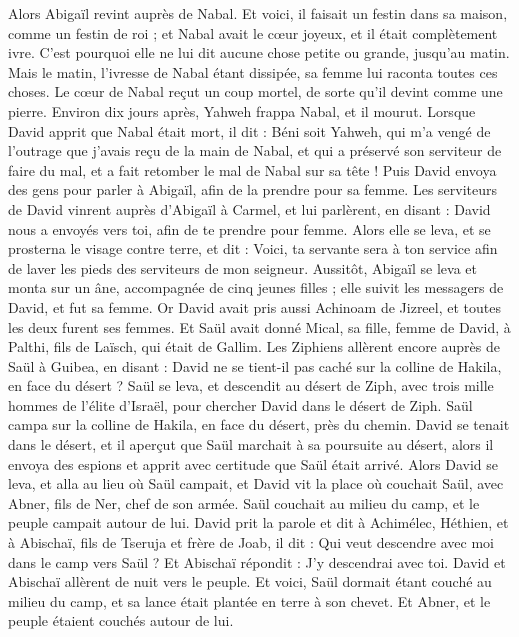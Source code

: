 \begin{multicols}{2}
Alors Abigaïl revint auprès de Nabal. Et voici, il faisait un festin dans sa maison, comme un festin de roi ; et Nabal avait le cœur joyeux, et il était complètement ivre. C'est pourquoi elle ne lui dit aucune chose petite ou grande, jusqu'au matin.
Mais le matin, l’ivresse de Nabal étant dissipée, sa femme lui raconta toutes ces choses. Le cœur de Nabal reçut un coup mortel, de sorte qu'il devint comme une pierre.
Environ dix jours après, Yahweh frappa Nabal, et il mourut.
Lorsque David apprit que Nabal était mort, il dit : Béni soit Yahweh, qui m'a vengé de l'outrage que j'avais reçu de la main de Nabal, et qui a préservé son serviteur de faire du mal, et a fait retomber le mal de Nabal sur sa tête ! Puis David envoya des gens pour parler à Abigaïl, afin de la prendre pour sa femme.
Les serviteurs de David vinrent auprès d'Abigaïl à Carmel, et lui parlèrent, en disant : David nous a envoyés vers toi, afin de te prendre pour femme.
Alors elle se leva, et se prosterna le visage contre terre, et dit : Voici, ta servante sera à ton service afin de laver les pieds des serviteurs de mon seigneur.
Aussitôt, Abigaïl se leva et monta sur un âne, accompagnée de cinq jeunes filles ; elle suivit les messagers de David, et fut sa femme.
Or David avait pris aussi Achinoam de Jizreel, et toutes les deux furent ses femmes.
Et Saül avait donné Mical, sa fille, femme de David, à Palthi, fils de Laïsch, qui était de Gallim.
\VerseOne{}Les Ziphiens allèrent encore auprès de Saül à Guibea, en disant : David ne se tient-il pas caché sur la colline de Hakila, en face du désert ?
Saül se leva, et descendit au désert de Ziph, avec trois mille hommes de l'élite d'Israël, pour chercher David dans le désert de Ziph.
Saül campa sur la colline de Hakila, en face du désert, près du chemin. David se tenait dans le désert, et il aperçut que Saül marchait à sa poursuite au désert,
alors il envoya des espions et apprit avec certitude que Saül était arrivé.
Alors David se leva, et alla au lieu où Saül campait, et David vit la place où couchait Saül, avec Abner, fils de Ner, chef de son armée. Saül couchait au milieu du camp, et le peuple campait autour de lui.
David prit la parole et dit à Achimélec, Héthien, et à Abischaï, fils de Tseruja et frère de Joab, il dit : Qui veut descendre avec moi dans le camp vers Saül ? Et Abischaï répondit : J'y descendrai avec toi.
David et Abischaï allèrent de nuit vers le peuple. Et voici, Saül dormait étant couché au milieu du camp, et sa lance était plantée en terre à son chevet. Et Abner, et le peuple étaient couchés autour de lui.

\end{multicols}
